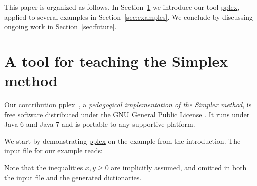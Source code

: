 \documentclass[ukenglish]{nik}
\begin{document}
This paper is organized as follows.
In Section~\ref{sec:pplex} we introduce 
our tool \url{pplex}, applied to several examples in Section~\ref{sec:examples}.
We conclude by discussing ongoing work in Section~\ref{sec:future}.

\section{A tool for teaching the Simplex method}\label{sec:pplex}
Our contribution \url{pplex}~\cite{pplex},
a \emph{pedagogical implementation of the Simplex method},
is free software distributed under the GNU General Public License \cite{GNUGPL}.
It runs under Java 6 and Java 7 and is portable to any supportive platform.

We start by demonstrating \url{pplex} on the example from the introduction.
The input file for our example reads:
\begin{alltt}

\end{alltt}
Note that the inequalities $x,y \geq 0$ are implicitly assumed, and omitted in both the input file and the generated dictionaries.
\end{document}
